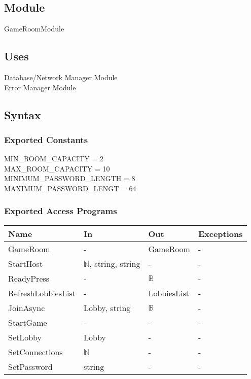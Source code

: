 \documentclass[12pt, titlepage]{article}
\begin{document}
\subsection{Module}

GameRoomModule

\subsection{Uses}

Database/Network Manager Module\\
Error Manager Module

\subsection{Syntax}

\subsubsection{Exported Constants}

MIN\_ROOM\_CAPACITY = 2\\
MAX\_ROOM\_CAPACITY = 10\\
MINIMUM\_PASSWORD\_LENGTH = 8\\
MAXIMUM\_PASSWORD\_LENGT = 64\\

\subsubsection{Exported Access Programs}

\begin{center}
\begin{tabular}{p{5cm} p{4cm} p{4cm} p{2cm}}
\hline
\textbf{Name} & \textbf{In} & \textbf{Out} & \textbf{Exceptions} \\
\hline
GameRoom & - & GameRoom & - \\
StartHost & $\mathbb{N}$, string, string & - & - \\
ReadyPress  & - & $\mathbb{B}$ & - \\
RefreshLobbiesList  & - & LobbiesList & - \\
JoinAsync  & Lobby, string & $\mathbb{B}$ & - \\
StartGame & - & - & - \\
SetLobby  & Lobby & - & - \\
SetConnections & $\mathbb{N}$ & - & - \\
SetPassword & string & - & - \\
\hline
\end{tabular}
\end{center}
\end{document}
